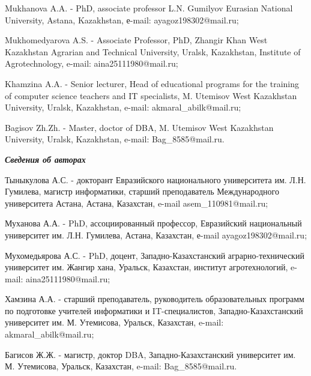 Mukhanova A.A. - PhD, associate professor L.N. Gumilyov Eurasian
National University, Astana, Kazakhstan, е-mail: ayagoz198302@mail.ru;

Mukhomedyarova A.S. - Associate Professor, PhD, Zhangir Khan West
Kazakhstan Agrarian and Technical University, Uralsk, Kazakhstan,
Institute of Agrotechnology, e-mail: aina25111980@mail.ru;

Khamzina A.A. - Senior lecturer, Head of educational programs for the
training of computer science teachers and IT specialists, M. Utemisov
West Kazakhstan University, Uralsk, Kazakhstan, e-mail:
akmaral\_abilk@mail.ru;

Bagisov Zh.Zh. - Master, doctor of DBA, M. Utemisov West Kazakhstan
University, Uralsk, Kazakhstan, e-mail: Bag\_8585@mail.ru.

\emph{{\bfseries Сведения об авторах}}

Тыныкулова А.С. - докторант Евразийского национального университета им.
Л.Н. Гумилева, магистр информатики, старший преподаватель Международного
университета Астана, Астана, Казахстан, e-mail asem\_110981@mail.ru;

Муханова А.А. - PhD, ассоциированный профессор, Евразийский национальный
университет им. Л.Н. Гумилева, Астана, Казахстан, е-mail
ayagoz198302@mail.ru;

Мухомедьярова А.С. - PhD, доцент, Западно-Казахстанский
аграрно-технический университет им. Жангир хана, Уральск, Казахстан,
институт агротехнологий, e-mail: aina25111980@mail.ru;

Хамзина А.А. - старший преподаватель, руководитель образовательных
программ по подготовке учителей информатики и IT-специалистов,
Западно-Казахстанский университет им. М. Утемисова, Уральск, Казахстан,
e-mail: akmaral\_abilk@mail.ru;

Багисов Ж.Ж. - магистр, доктор DBA, Западно-Казахстанский университет
им. М. Утемисова, Уральск, Казахстан, e-mail: Bag\_8585@mail.ru.
